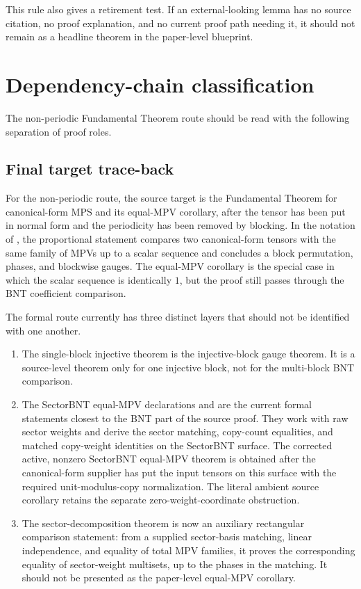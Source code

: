 \documentclass{article}
\begin{document}
This rule also gives a retirement test. If an external-looking lemma has no
source citation, no proof explanation, and no current proof path needing it, it
should not remain as a headline theorem in the paper-level blueprint.

\section{Dependency-chain classification}

The non-periodic Fundamental Theorem route should be read with the following
separation of proof roles.

\subsection{Final target trace-back}

For the non-periodic route, the source target is the Fundamental Theorem for
canonical-form MPS and its equal-MPV corollary, after the tensor has been put in
normal form and the periodicity has been removed by blocking. In the notation
of \cite[lines~347--356]{Cirac2016MPDO_arXiv}, the proportional statement
compares two canonical-form tensors with the same family of MPVs up to a scalar
sequence and concludes a block permutation, phases, and blockwise gauges. The
equal-MPV corollary is the special case in which the scalar sequence is
identically $1$, but the proof still passes through the BNT coefficient
comparison.

The formal route currently has three distinct layers that should not be
identified with one another.
\begin{enumerate}
  \item The single-block injective theorem
     is the injective-block
    gauge theorem. It is a source-level theorem only for one injective block,
    not for the multi-block BNT comparison.
  \item The SectorBNT equal-MPV declarations
     and
     are the current formal
    statements closest to the BNT part of the source proof. They work with raw
    sector weights and derive the sector matching, copy-count equalities, and
    matched copy-weight identities on the SectorBNT surface. The corrected
    active, nonzero SectorBNT equal-MPV theorem is obtained after the
    canonical-form supplier has put the input tensors on this surface with the
    required unit-modulus-copy normalization. The literal ambient source
    corollary retains the separate zero-weight-coordinate obstruction.
  \item The sector-decomposition theorem
    is now an auxiliary rectangular comparison statement: from a supplied
    sector-basis matching, linear independence, and equality of total MPV
    families, it proves the corresponding equality of sector-weight multisets,
    up to the phases in the matching. It should not be presented as the
    paper-level equal-MPV corollary.
\end{enumerate}
\end{document}
